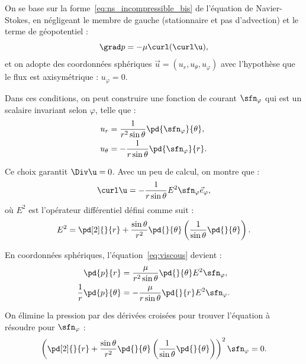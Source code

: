 \begin{redmargin}

On se base sur la forme~\eqref{eq:ns_incompressible_bis} de l'équation de Navier-Stokes, en négligeant le membre de gauche (stationnaire et pas d'advection) et le terme de géopotentiel :
\begin{equation}
  \grad p = - \mu \curl(\curl \u),
  \label{eq:viscous}
\end{equation}
et on adopte des coordonnées sphériques $\vec{u} = (u_r, u_\theta, u_\varphi)$ avec l'hypothèse que le flux est axisymétrique : $u_\varphi = 0$.

Dans ces conditions, on peut construire une fonction de courant $\sfn_\varphi$ qui est un scalaire invariant selon $\varphi$, telle que :
\begin{equation}
  \begin{split}
    u_r &= \frac{1}{r^2 \sin\theta}\pd{\sfn_\varphi}{\theta}, \\
    u_\theta &= -\frac{1}{r \sin\theta}\pd{\sfn_\varphi}{r}.
  \end{split}
  \label{eq:potentiel_spherique}
\end{equation}

Ce choix garantit $\Div \u = 0$. Avec un peu de calcul, on montre que :
\begin{displaymath}
  \curl \u = -\frac{1}{r\sin\theta}E^2\sfn_\varphi \vec{e}_{\varphi},
\end{displaymath}
où $E^2$ est l'opérateur différentiel défini comme suit :
\begin{displaymath}
  E^2 = \pd[2]{}{r} + \frac{\sin\theta}{r^2}\pd{}{\theta}\left(\frac{1}{\sin\theta}\pd{}{\theta}\right).
\end{displaymath}

En coordonnées sphériques, l'équation~\eqref{eq:viscous} devient :
\begin{align*}
  \pd{p}{r} &= \frac{\mu}{r^2\sin\theta}\pd{}{\theta}E^2\sfn_\varphi, \\
  \frac{1}{r}\pd{p}{\theta} &= -\frac{\mu}{r\sin\theta}\pd{}{r}E^2\sfn_\varphi.
\end{align*}

On élimine la pression par des dérivées croisées pour trouver l'équation à résoudre pour $\sfn_\varphi$ :
\begin{equation}
  \left(\pd[2]{}{r} + \frac{\sin\theta}{r^2}\pd{}{\theta}\left(\frac{1}{\sin\theta}\pd{}{\theta}\right) \right)^2 \sfn_\varphi = 0.
  \label{eq:stokes_equation_sphere}
\end{equation}


\end{redmargin}
